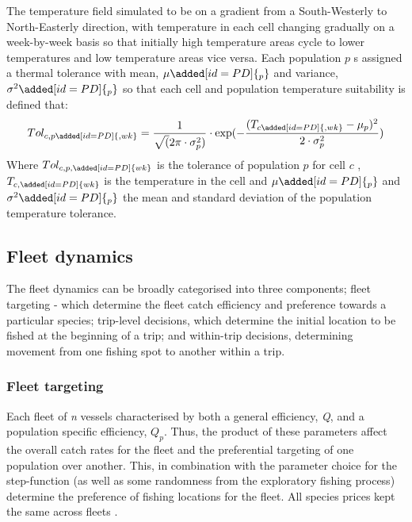 \documentclass[review]{elsarticle}
\begin{document}
The temperature field  simulated to be on a gradient
from a South-Westerly to North-Easterly direction, with temperature in each
cell changing gradually on a week-by-week basis so that initially high
temperature areas cycle to lower temperatures and low
temperature areas vice versa. Each population $p$ s
assigned a thermal tolerance with mean, $\mu\added[id=PD]{_{p}}$ and variance,
$\sigma^2\added[id=PD]{_{p}}$ so that each cell and population temperature
suitability is defined that:
\begin{equation}
	Tol_{c, p\added[id=PD]{, wk}} = \frac{1}{ \sqrt (2\pi \cdot \sigma^2_{p})} \cdot \exp(-
		\frac{(T_{c\added[id=PD]{, wk}} - \mu_{p})^2}{2 \cdot \sigma^2_{p}} )	
\end{equation}
Where $Tol_{c, p, \added[id=PD]{wk}}$ is the tolerance of population $p$ for
cell $c$ , $T_{c, \added[id=PD]{wk}}$ is the
temperature in the cell  and
$\mu\added[id=PD]{_{p}}$ and $\sigma^2\added[id=PD]{_{p}}$ the mean and
standard deviation of the population temperature tolerance. \\


\subsection{Fleet dynamics}

The fleet dynamics can be broadly categorised into three components; fleet
targeting - which determine the fleet catch efficiency
and preference towards a particular species; trip-level decisions, which
determine the initial location to be fished at the beginning of
a trip; and within-trip decisions, determining movement from one fishing spot
to another within a trip.

\subsubsection{Fleet targeting}

Each fleet of \textit{n} vessels  characterised by
both a general efficiency, \textit{Q}, and a population specific efficiency,
${Q_{p}}$.  Thus, the product of these parameters affect
the overall catch rates for the fleet and the preferential targeting of one
population over another. This, in combination with the parameter choice for the
step-function  (as well as some randomness from the
exploratory fishing process) determine the preference of
fishing locations for the fleet.  All species prices
 kept the same across fleets .  
\end{document}
